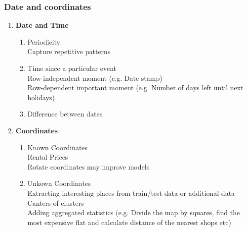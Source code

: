 \documentclass[11pt, twoside]{article}   	%
\begin{document}
\subsubsection{Date and coordinates}
\renewcommand{\labelenumii}{\alph{enumii}}
\begin{enumerate}
  \item \textbf{Date and Time}
    \begin{enumerate}
      \item Periodicity 
        \\\indent Capture repetitive patterns
      \item  Time since a particular event
        \\\indent Row-independent moment (e.g. Date stamp)
        \\\indent Row-dependent important moment (e.g. Number of days left until next holidays)       
      \item Difference between dates
        \\\indent 
    \end{enumerate}
  \item \textbf{Coordinates}
    \begin{enumerate}
      \item Known Coordinates               
        \\\indent Rental Prices
        \\\indent Rotate coordinates may improve models
  
      \item Unkown Coordinates
        \\\indent Extracting interesting places from train/test data or additional data
        \\\indent Canters of clusters            
         \\\indent Adding aggregated statistics (e.g. Divide the map by squares, find the most expensive flat and calculate distance of the nearest shops etc)
        
    \end{enumerate}
  \end{enumerate}


%
\end{document}
